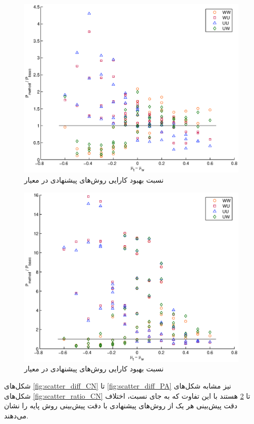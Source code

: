 \begin{figure}[!htb]
  \begin{center}
    \includegraphics[width=12cm]{scatter_ratio_RA.eps}
    \caption{نسبت بهبود کارایی روش‌های پیشنهادی در معیار }
    \label{fig:scatter_ratio_RA}
  \end{center}
\end{figure}
\begin{figure}[!htb]
  \begin{center}
    \includegraphics[width=12cm]{scatter_ratio_PA.eps}
    \caption{نسبت بهبود کارایی روش‌های پیشنهادی در معیار }
    \label{fig:scatter_ratio_PA}
  \end{center}
\end{figure}

شکل‌های \ref{fig:scatter_diff_CN} تا \ref{fig:scatter_diff_PA} نیز مشابه شکل‌های شکل‌های \ref{fig:scatter_ratio_CN} تا \ref{fig:scatter_ratio_PA} هستند با این تفاوت که به جای نسبت، اختلاف دقت پیش‌بینی هر یک از روش‌های پیشنهادی با دقت پیش‌بینی روش پایه را نشان می‌دهند. %

